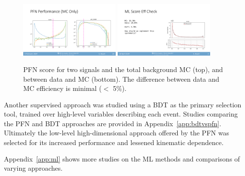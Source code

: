 \begin{figure}[!htbp]
\centering
   \includegraphics[width=0.45\textwidth]{figures/ml/pfn_score_all}
   \includegraphics[width=0.45\textwidth]{figures/ml/mlscore_effComp}
    \caption{PFN score for two signals and the total background MC (top), and between data and MC (bottom). The difference between data and MC efficiency is minimal ($<$ 5\%).
    \label{fig:pfn_score_all}}
\end{figure}

Another supervised approach was studied using a BDT as the primary selection tool, trained over high-level variables describing each event. 
Studies comparing the PFN and BDT approaches are provided in Appendix~\ref{app:bdtvspfn}.
Ultimately the low-level high-dimensional approach offered by the PFN was selected for its increased performance and lessened kinematic dependence.

Appendix~\ref{app:ml} shows more studies on the ML methods and comparisons of varying approaches. 

\clearpage


